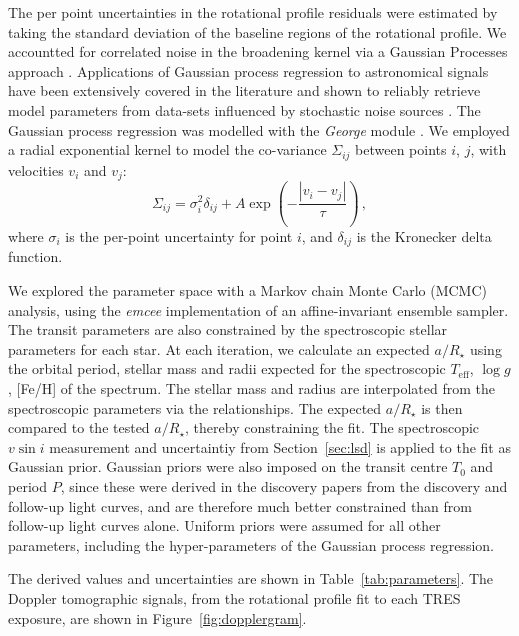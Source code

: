 \documentclass[useAMS,usenatbib]{mn2e}
\begin{document}
The per point uncertainties in the rotational profile residuals were estimated by taking the standard deviation of the baseline regions of the rotational profile. We accountted for correlated noise in the broadening kernel via a Gaussian Processes approach \citep[e.g.][]{2015AJ....150..197H}. Applications of Gaussian process regression to astronomical signals have been extensively covered in the literature and shown to reliably retrieve model parameters from data-sets influenced by stochastic noise sources \citep[e.g.][]{2012MNRAS.419.2683G,2014MNRAS.445.3401G}. The Gaussian process regression was modelled with the \emph{George} module \citep{2014arXiv1403.6015A}. We employed a radial exponential kernel to model the co-variance $\Sigma_{ij}$ between points $i$, $j$, with velocities $v_{i}$ and $v_{j}$:
\begin{equation}
  \Sigma_{ij} = \sigma_{i}^2 \delta_{ij} + A \exp \left(- \frac{|v_{i}-v_{j}|}{\tau} \right)\,,
\end{equation}
where $\sigma_{i}$ is the per-point uncertainty for point $i$, and $\delta_{ij}$ is the Kronecker delta function.


We explored the parameter space with a Markov chain Monte Carlo (MCMC) analysis, using the \emph{emcee} implementation \citep{2013PASP..125..306F} of an affine-invariant ensemble sampler. The transit parameters are also constrained by the spectroscopic stellar parameters for each star. At each iteration, we calculate an expected $a/R_\star$ using the orbital period, stellar mass and radii expected for the spectroscopic $T_\text{eff}$, $\log g$, [Fe/H] of the spectrum. The stellar mass and radius are interpolated from the spectroscopic parameters via the \citet{2010A&amp;ARv..18...67T} relationships. The expected $a/R_\star$ is then compared to the tested $a/R_\star$, thereby constraining the fit. The spectroscopic $v \sin i$ measurement and uncertaintiy from Section~\ref{sec:lsd} is applied to the fit as Gaussian prior. Gaussian priors were also imposed on the transit centre $T_0$ and period $P$, since these were derived in the discovery papers from the discovery and follow-up light curves, and are therefore much better constrained than from follow-up light curves alone. Uniform priors were assumed for all other parameters, including the hyper-parameters of the Gaussian process regression. 

The derived values and uncertainties are shown in Table~\ref{tab:parameters}. The Doppler tomographic signals, from the rotational profile fit to each TRES exposure, are shown in Figure~\ref{fig:dopplergram}. 
\end{document}

